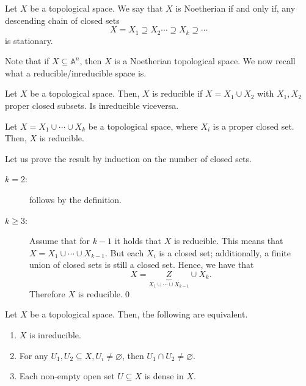 \documentclass{subfiles}
\begin{document}
    \begin{definition*}    
        Let \(X\) be a topological space. We say that \(X\) is Noetherian 
            if and only if, any descending chain of closed sets 
            \[
                X = X_{1} \supseteq X_{2} \cdots \supseteq X_{k} \supseteq  \cdots
            \]
            is stationary.
    \end{definition*}

    Note that if \(X \subseteq \mathbb{A}^{n}\), then \(X\) is a Noetherian topological space.
        We now recall what a reducible/inreducible space is.
    \begin{definition*}
        Let \(X\) be a topological space. Then, 
            \(X\) is reducible if \(X = X_{1} \cup X_{2}\) with \(X_{1}, X_{2}\)
            proper closed subsets. Is inreducible viceversa.
    \end{definition*}

    \begin{lemma*}
        Let \(X = X_{1} \cup \cdots \cup X_{k}\) be a topological space,
            where \(X_{i}\) is a proper closed set. Then, \(X\) is reducible.
    \end{lemma*}

    \begin{proof*}
        Let us prove the result by induction on the number of closed sets.
        \begin{description}
            \item [\(k = 2\):] follows by the definition.
            \item [\(k \ge 3\):] Assume that for \(k - 1\) it holds that \(X\)
                is reducible. This means that \(X = X_{1} \cup \cdots \cup X_{k - 1}\).
                But each \(X_{i}\) is a closed set; additionally, a finite union of 
                closed sets is still a closed set. Hence, we have that 
                \[
                    X = \underbrace{Z}_{X_{1} \cup \cdots \cup X_{k - 1}} \cup X_{k}.
                \]
                Therefore \(X\) is reducible.\qed
        \end{description} 
    \end{proof*}

    \begin{lemma*}
        Let \(X\) be a topological space. Then, the following are equivalent.
        \begin{enumerate}
            \item \label{case:1} \(X\) is inreducible.
            \item \label{case:2} For any \(U_{1}, U_{2} \subseteq X, U_{i} \ne \varnothing\), 
                then \(U_{1} \cap U_{2} \ne \varnothing\).
            \item \label{case:3} Each non-empty open set \(U \subseteq X\) is dense in \(X\).
        \end{enumerate}
    \end{lemma*}
\end{document}
